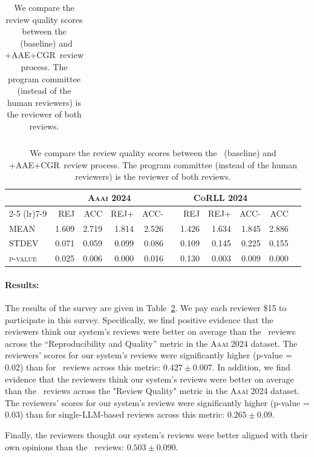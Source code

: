 \begin{minipage}[t]{\linewidth}
\begin{table}[t]
\begin{tabular}{l|rrrr|rrr|rrr}
\bottomrule
\end{tabular}
\caption{We compare the review quality scores between the \singlellm\ (baseline) and \singlellm+AAE+CGR\ review process. The program committee (instead of the human reviewers) is the reviewer of both reviews.}
\begin{tabular}{l|rrrr|rrr|rrr}
\toprule
\multirow{2}{*}{\textbf{}}        & \multicolumn{4}{c|}{\textbf{\textsc{Aaai 2024}}}            &  & \multicolumn{3}{c}{\textbf{\textsc{CoRLL 2024}}} \\
\cmidrule(lr){2-5} \cmidrule(lr){7-9}
                         & REJ   & ACC    & REJ+    & ACC-    &  & REJ   & REJ+    & ACC-    & ACC \\
\textsc{MEAN}              & 1.609 & 2.719 & 1.814 & 2.526 &  & 1.426 & 1.634 & 1.845 & 2.886 \\ \hline
\textsc{STDEV}            & 0.071 & 0.059 & 0.099 & 0.086 &  & 0.109 & 0.145 & 0.225 & 0.155 \\
\textsc{p-value}         & 0.025 & 0.006 & 0.000 & 0.016 &  & 0.130 & 0.003 & 0.009 & 0.000 \\
\bottomrule
\end{tabular}
\label{tab:reviewer-opinions}
\end{table}

\paragraph{Results:}
The results of the survey are given in Table~\ref{tab:reviewer-opinions}. We pay each reviewer \$15 to participate in this survey. 
Specifically, we find positive evidence that the reviewers think our system's reviews were better on average than the \singlellm\ reviews across the ``Reproducibility and Quality'' metric in the \textsc{Aaai 2024} dataset. The reviewers' scores for our system's reviews were significantly higher (p-value = 0.02) than for \singlellm\ reviews across this metric: $0.427 \pm 0.007$. 
In addition, we find evidence that the reviewers think our system's reviews were better on average than the \singlellm\ reviews across the "Review Quality" metric in the \textsc{Aaai 2024} dataset. The reviewers' scores for our system's reviews were significantly higher (p-value = 0.03) than for single-LLM-based reviews across this metric: $0.265 \pm 0.09$.

Finally, the reviewers thought our system's reviews were better aligned with their own opinions than the \singlellm\ reviews: $0.503 \pm 0.090$. 

\end{minipage}
